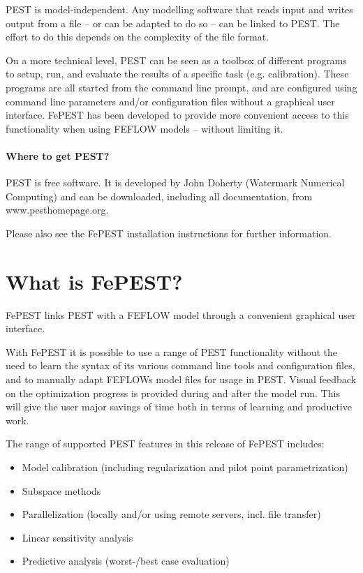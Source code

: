 PEST is model-independent. Any modelling software that reads input and writes output from a file – or can be adapted to do so – can be linked to PEST. The effort to do this depends on the complexity of the file format.

On a more technical level, PEST can be seen as a toolbox of different programs to setup, run, and evaluate the results of a specific task (e.g. calibration). These programs are all started from the command line prompt, and are configured using command line parameters and/or configuration files without a graphical user interface. FePEST has been developed to provide more convenient access to this functionality when using FEFLOW models – without limiting it. 

\paragraph{Where to get PEST?}

PEST is free software. It is developed by John Doherty (Watermark Numerical Computing) and can be downloaded, including all documentation, from www.pesthomepage.org.

Please also see the FePEST installation instructions for further information.

\section{What is FePEST?}

FePEST links PEST with a FEFLOW model through a convenient graphical user interface.

With FePEST it is possible to use a range of PEST functionality without the need to learn the syntax of its various command line tools and configuration files, and to manually adapt FEFLOWs model files for usage in PEST. Visual feedback on the optimization progress is provided during and after the model run. This will give the user major savings of time both in terms of learning and productive work.

The range of supported PEST features in this release of FePEST includes:
\begin{itemize}
\item Model calibration (including regularization and pilot point parametrization)
\item Subspace methods
\item Parallelization (locally and/or using remote servers, incl. file transfer)
\item Linear sensitivity analysis
\item Predictive analysis (worst-/best case evaluation)
\end{itemize}

